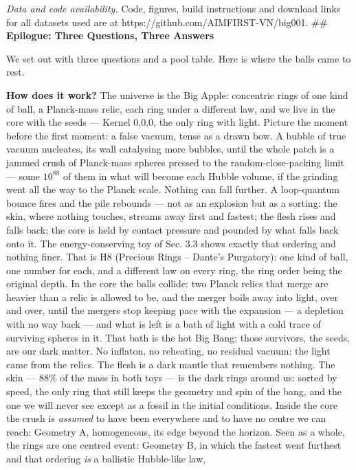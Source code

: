 \documentclass[
  11pt,
]{article}
\begin{document}
\emph{Data and code availability.} Code, figures, build instructions and
download links for all datasets used are at
https://github.com/AIMFIRST-VN/big001. \#\# \textbf{Epilogue: Three
Questions, Three Answers}

We set out with three questions and a pool table. Here is where the
balls came to rest.

\textbf{How does it work?} The universe is the Big Apple: concentric
rings of one kind of ball, a Planck-mass relic, each ring under a
different law, and we live in the core with the seeds --- Kernel 0,0,0,
the only ring with light. Picture the moment before the first moment: a
false vacuum, tense as a drawn bow. A bubble of true vacuum nucleates,
its wall catalysing more bubbles, until the whole patch is a jammed
crush of Planck-mass spheres pressed to the random-close-packing limit
--- some \(10^{88}\) of them in what will become each Hubble volume, if
the grinding went all the way to the Planck scale. Nothing can fall
further. A loop-quantum bounce fires and the pile rebounds --- not as an
explosion but as a sorting: the skin, where nothing touches, streams
away first and fastest; the flesh rises and falls back; the core is held
by contact pressure and pounded by what falls back onto it. The
energy-conserving toy of Sec. 3.3 shows exactly that ordering and
nothing finer. That is H8 (Precious Rings -- Dante's Purgatory): one
kind of ball, one number for each, and a different law on every ring,
the ring order being the original depth. In the core the balls collide:
two Planck relics that merge are heavier than a relic is allowed to be,
and the merger boils away into light, over and over, until the mergers
stop keeping pace with the expansion --- a depletion with no way back
--- and what is left is a bath of light with a cold trace of surviving
spheres in it. That bath is the hot Big Bang; those survivors, the
seeds, are our dark matter. No inflaton, no reheating, no residual
vacuum: the light came from the relics. The flesh is a dark mantle that
remembers nothing. The skin --- \(88\%\) of the mass in both toys --- is
the dark rings around us: sorted by speed, the only ring that still
keeps the geometry and spin of the bang, and the one we will never see
except as a fossil in the initial conditions. Inside the core the crush
is \emph{assumed} to have been everywhere and to have no centre we can
reach: Geometry A, homogeneous, its edge beyond the horizon. Seen as a
whole, the rings are one centred event: Geometry B, in which the fastest
went furthest and that ordering \emph{is} a ballistic Hubble-like law,
\end{document}

